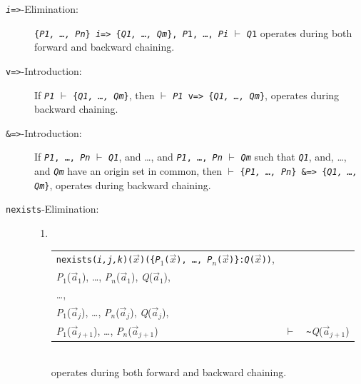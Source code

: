\documentclass{book}
\begin{document}
\begin{description}
\item[\texttt{\textit{i}=>}-Elimination:] \texttt{\{\textit{P1,
      \ldots, Pn}\} \textit{i}=> \{\textit{Q1, \ldots, Qm}\},
    \texttt{\textit{P}1,} \ldots, \textit{Pi}} $\vdash$ \texttt{\textit{Q}1}
  operates during both forward and backward chaining.
  
\item[\texttt{v=>}-Introduction:] If \texttt{\textit{P1}} $\vdash$
  \texttt{\{\textit{Q1, \dots, Qm}\}}, then $\vdash$ \texttt{\textit{P1} v=>
    \{\textit{Q1, \ldots, Q\textit{m}}\}}, operates during backward chaining.
     
\item[\texttt{\&=>}-Introduction:] If \texttt{\textit{P1}, \ldots,
    \textit{Pn}} $\vdash$ \texttt{\textit{Q1}}, and \ldots, and
  \texttt{\textit{P1}, \ldots, \textit{Pn}} $\vdash$
  \texttt{\textit{Q\textit{m}}} such that \texttt{\textit{Q1}}, and,
  \ldots, and \texttt{\textit{Qm}} have an origin set in common, then
  $\vdash$ \texttt{\{\textit{P1, \ldots, Pn}\} \&=> \{\textit{Q1,
      \ldots, Qm}\}}, operates during backward chaining.

\pagebreak
\item[\texttt{nexists}-Elimination:]\mbox{}
  \begin{enumerate}
  \item\mbox{}\\
    \begin{tabular}{lcl}
    \texttt{nexists(\textit{i,j,k})($\vec{x}$)(\{\textit{P}$_1$($\vec{x}$),
      \ldots, \textit{P$_n$}($\vec{x}$)\}:\textit{Q}($\vec{x}$))},\\
    \textit{P}$_1$($\vec{a}_1$), \ldots, \textit{P$_n$}($\vec{a}_1$),
    \textit{Q}($\vec{a}_1$),\\ \ldots,\\
    \textit{P}$_1$($\vec{a}_j$), \ldots, \textit{P$_n$}($\vec{a}_j$),
    \textit{Q}($\vec{a}_j$),\\
    \textit{P}$_1$($\vec{a}_{j+1}$), \ldots,
    \textit{P$_n$}($\vec{a}_{j+1}$)&
    $\vdash$& \verb|~|\textit{Q}($\vec{a}_{j+1}$)
    \end{tabular}\\
operates during both forward and backward chaining.



\end{enumerate}
\end{description}
\end{document}
